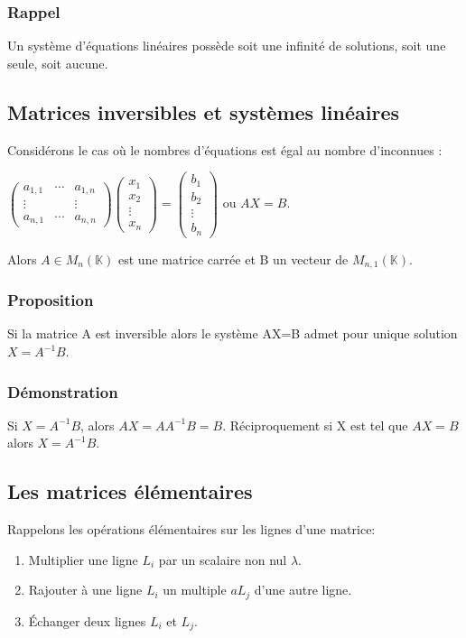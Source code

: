 \documentclass[a4paper,10pt]{book} %
\newcommand{\K}{\mathbb{K}}
\begin{document}
\subsubsection{Rappel}
Un système d'équations linéaires possède soit une infinité de solutions, soit une seule, soit aucune.

\subsection{Matrices inversibles et systèmes linéaires}
Considérons le cas où le nombres d'équations est égal au nombre d'inconnues :
\begin{center} $\begin{pmatrix}
a_{1,1} & \cdots & a_{1,n} \\
\vdots & & \vdots \\
a_{n,1} & \cdots & a_{n,n}
\end{pmatrix} \begin{pmatrix}
x_1 \\ x_2 \\ \vdots \\ x_n
\end{pmatrix}
= \begin{pmatrix}
b_1 \\ b_2 \\ \vdots \\ b_n
\end{pmatrix}$
ou $AX=B$. \end{center}

Alors $A\in M_n(\K)$ est une matrice carrée et B un vecteur de $M_{n,1}(\K)$.

\subsubsection{Proposition}
Si la matrice A est inversible alors le système AX=B admet pour unique solution $X=A^{-1}B$.

\subsubsection{Démonstration}
Si $X=A^{-1}B$, alors $AX=AA^{-1}B=B$. Réciproquement si X est tel que $AX=B$ alors $X=A^{-1}B$.

\newpage

\subsection{Les matrices élémentaires}
Rappelons les opérations élémentaires sur les lignes d'une matrice:\\
\begin{enumerate}
\item Multiplier une ligne $L_i$ par un scalaire non nul $\lambda$.
\item Rajouter à une ligne $L_i$ un multiple $aL_j$ d'une autre ligne.
\item Échanger deux lignes $L_i$ et $L_j$.
\end{enumerate}
\end{document}
